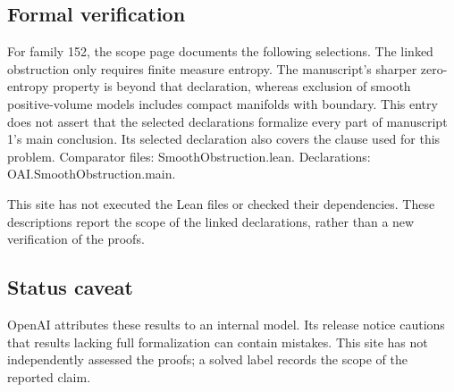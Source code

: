 \documentclass[11pt]{article}
\begin{document}
\subsection{Formal verification}
For family 152, the scope page documents the following selections. The linked obstruction only requires finite measure entropy. The manuscript's sharper zero-entropy property is beyond that declaration, whereas exclusion of smooth positive-volume models includes compact manifolds with boundary. This entry does not assert that the selected declarations formalize every part of manuscript 1's main conclusion. Its selected declaration also covers the clause used for this problem. Comparator files: SmoothObstruction.lean. Declarations: OAI.SmoothObstruction.main.

This site has not executed the Lean files or checked their dependencies. These descriptions report the scope of the linked declarations, rather than a new verification of the proofs.

\subsection{Status caveat}
OpenAI attributes these results to an internal model. Its release notice cautions that results lacking full formalization can contain mistakes. This site has not independently assessed the proofs; a solved label records the scope of the reported claim.
\end{document}

